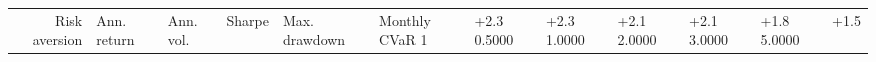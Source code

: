 \begin{tabular}{rlllllll}
\toprule
Risk aversion & Ann. return & Ann. vol. & Sharpe & Max. drawdown & Monthly CVaR 1%
 & +2.3%
0.5000 & +2.3%
1.0000 & +2.1%
2.0000 & +2.1%
3.0000 & +1.8%
5.0000 & +1.5%
\bottomrule
\end{tabular}

